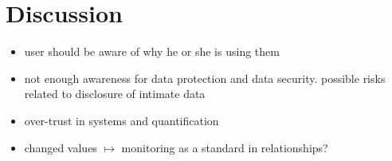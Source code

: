 \section{Discussion}
\begin{itemize}
	\item user should be aware of why he or she is using them
	\item not enough awareness for data protection and data security. possible risks related to disclosure of intimate data
	\item over-trust in systems and quantification
	\item changed values $\mapsto $ monitoring as a standard in relationships?
\end{itemize}
